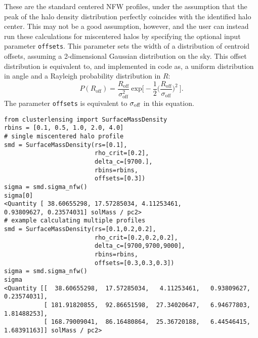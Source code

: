 \documentclass{emulateapj}
\newcommand{\code}{\lstinline[style=codeintext]}
\begin{document}
These are the standard centered NFW profiles, under the assumption that the peak of the halo density distribution perfectly coincides with the identified halo center. This may not be a good assumption, however, and the user can instead run these calculations for miscentered halos by specifying the optional input parameter \code{offsets}. This parameter sets the width of a distribution of centroid offsets, assuming a 2-dimensional Gaussian distribution on the sky. This offset distribution is equivalent to, and implemented in code as, a uniform distribution in angle and a Rayleigh probability distribution in $R$:
\begin{equation}\label{PofR}
P(R_{\mathrm{off}})=\frac{R_{\mathrm{off}}}{\sigma_{\mathrm{off}}^2}\ \mathrm{exp}\bigg[-\frac{1}{2}\bigg(\frac{R_{\mathrm{off}}}{\sigma_{\mathrm{off}}}\bigg)^2\ \bigg].
\end{equation}
The parameter \code{offsets} is equivalent to $\sigma_{\rm off}$ in this equation.

\begin{lstlisting}
from clusterlensing import SurfaceMassDensity
rbins = [0.1, 0.5, 1.0, 2.0, 4.0]
# single miscentered halo profile
smd = SurfaceMassDensity(rs=[0.1], 
                         rho_crit=[0.2], 
                         delta_c=[9700.], 
                         rbins=rbins,
                         offsets=[0.3])
sigma = smd.sigma_nfw()
sigma[0]
<Quantity [ 38.60655298, 17.57285034, 4.11253461, 
0.93809627, 0.23574031] solMass / pc2>
# example calculating multiple profiles
smd = SurfaceMassDensity(rs=[0.1,0.2,0.2], 
                         rho_crit=[0.2,0.2,0.2], 
                         delta_c=[9700,9700,9000], 
                         rbins=rbins, 
                         offsets=[0.3,0.3,0.3])
sigma = smd.sigma_nfw()
sigma 
<Quantity [[  38.60655298,  17.57285034,   4.11253461,   0.93809627,   0.23574031],
           [ 181.91820855,  92.86651598,  27.34020647,   6.94677803,  1.81488253],
           [ 168.79009041,  86.16480864,  25.36720188,   6.44546415,  1.68391163]] solMass / pc2>
\end{lstlisting}
\end{document}

